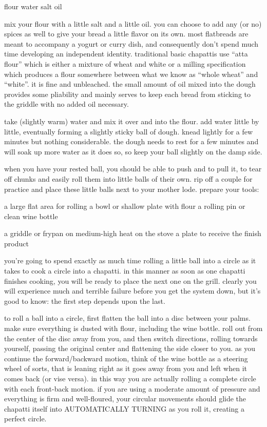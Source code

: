 flour
water
salt
oil

mix your flour with a little salt and a little oil.
	you can choose to add any (or no) spices as well to give your bread a little flavor on its own. most flatbreads are meant to accompany a yogurt or curry dish, and consequently don't spend much time developing an independent identity. traditional basic chapattis use ``atta flour'' which is either a mixture of wheat and white or a milling specification which produces a flour somewhere between what we know as ``whole wheat'' and ``white''. it is fine and unbleached. the small amount of oil mixed into the dough provides some pliability and mainly serves to keep each bread from sticking to the griddle with no added oil necessary.

take (slightly warm) water and mix it over and into the flour.
	add water little by little, eventually forming a slightly sticky ball of dough. knead lightly for a few minutes but nothing considerable. the dough needs to rest for a few minutes and will soak up more water as it does so, so keep your ball slightly on the damp side.

when you have your rested ball, you should be able to push and to pull it, to tear off chunks and easily roll them into little balls of their own. rip off a couple for practice and place these little balls next to your mother lode. prepare your tools:

a large flat area for rolling
a bowl or shallow plate with flour
a rolling pin or clean wine bottle

a griddle or frypan on medium-high heat on the stove
a plate to receive the finish product

you're going to spend exactly as much time rolling a little ball into a circle as it takes to cook a circle into a chapatti. in this manner as soon as one chapatti finishes cooking, you will be ready to place the next one on the grill. clearly you will experience much and terrible failure before you get the system down, but it's good to know: the first step depends upon the last.

to roll a ball into a circle, first flatten the ball into a disc between your palms. make sure everything is dusted with flour, including the wine bottle. roll out from the center of the disc away from you, and then switch directions, rolling towards yourself, passing the original center and flattening the side closer to you. as you continue the forward/backward motion, think of the wine bottle as a steering wheel of sorts, that is leaning right as it goes away from you and left when it comes back (or vise versa). in this way you are actually rolling a complete circle with each front-back motion. if you are using a moderate amount of pressure and everything is firm and well-floured, your circular movements should glide the chapatti itself into AUTOMATICALLY TURNING as you roll it, creating a perfect circle.

